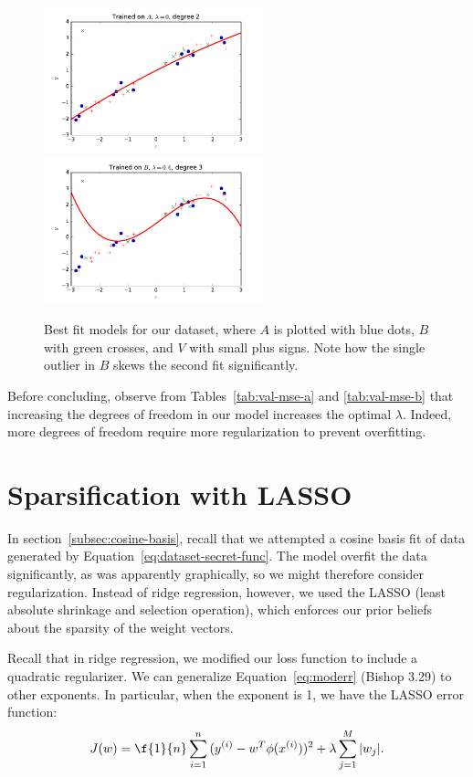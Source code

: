 \documentclass{article}
\begin{document}
\begin{multicols}{2}
\begin{figure}
   \centering
   \includegraphics[width=2.5in]{img/3-2_lambda0_degree2.pdf}
   \includegraphics[width=2.5in]{img/3-2_lambda6_degree3.pdf}
   \caption{Best fit models for our dataset, where $A$ is plotted with blue dots, $B$ with green crosses, and $V$ with small plus signs. Note how the single outlier in $B$ skews the second fit significantly.}
   \label{fig:3-2-bestfit}
\end{figure}

Before concluding, observe from Tables~\ref{tab:val-mse-a} and \ref{tab:val-mse-b} that increasing the degrees of freedom in our model increases the optimal $\lambda$. Indeed, more degrees of freedom require more regularization to prevent overfitting.



\section{Sparsification with LASSO}
\label{sec:lasso}

In section~\ref{subsec:cosine-basis}, recall that we attempted a cosine basis fit of data generated by Equation~\ref{eq:dataset-secret-func}.
The model overfit the data significantly, as was apparently graphically, so we might therefore consider regularization.
Instead of ridge regression, however, we used the LASSO (least absolute shrinkage and selection operation), which enforces our prior beliefs about the sparsity of the weight vectors.

Recall that in ridge regression, we modified our loss function to include a quadratic regularizer. We can generalize Equation~\ref{eq:moderr} (Bishop 3.29) to other exponents. In particular, when the exponent is 1, we have the LASSO error function:
\begin{equation}J(w) = \f{1}{n}\sum_{i=1}^n{(y^{(i)}-w^T\phi(x^{(i)}))^2} + \lambda \sum_{j=1}^M{|w_j|}.\end{equation}


\end{multicols}
\end{document}
